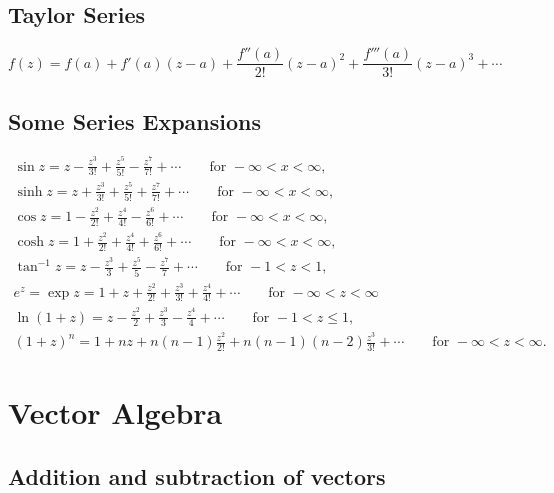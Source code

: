 \documentclass{article}
\begin{document}
\subsection{Taylor Series}
\begin{equation*}
    f(z) = f(a) + f'(a)(z - a) + \frac{f''(a)}{2!}(z - a)^2 + \frac{f'''(a)}{3!}(z - a)^3 + \cdots \qquad
\end{equation*}

\subsection{Some Series Expansions}

\begin{gather*}
    \sin{z} = z - \frac{z^3}{3!} + \frac{z^5}{5!} - \frac{z^7}{7!} + \cdots \qquad \text{for } -\infty < x < \infty, \\
    \sinh{z} = z + \frac{z^3}{3!} + \frac{z^5}{5!} + \frac{z^7}{7!} + \cdots \qquad \text{for } -\infty < x < \infty, \\
    \cos{z} = 1 - \frac{z^2}{2!} + \frac{z^4}{4!} - \frac{z^6}{6!} + \cdots \qquad \text{for } -\infty < x < \infty, \\
    \cosh{z} = 1 + \frac{z^2}{2!} + \frac{z^4}{4!} + \frac{z^6}{6!} + \cdots \qquad \text{for } -\infty < x < \infty, \\
    \tan^{-1}{z} = z - \frac{z^3}{3} + \frac{z^5}{5} - \frac{z^7}{7} + \cdots \qquad \text{for } -1 < z < 1, \\
    e^z = \exp{z} = 1 + z + \frac{z^2}{2!} + \frac{z^3}{3!} + \frac{z^4}{4!} + \cdots \qquad \text{for } -\infty < z < \infty \\
    \ln{(1 + z)} = z - \frac{z^2}{2} + \frac{z^3}{3} - \frac{z^4}{4} + \cdots \qquad \text{for } -1 < z \leqslant 1, \\
    \left( 1 + z \right)^n = 1 + nz + n \left( n - 1 \right) \frac{z^2}{2!} + n \left( n - 1 \right) \left( n - 2 \right) \frac{z^3}{3!} + \cdots \qquad \text{for } -\infty < z < \infty.
\end{gather*}

\section{Vector Algebra}

\subsection{Addition and subtraction of vectors}
\end{document}
